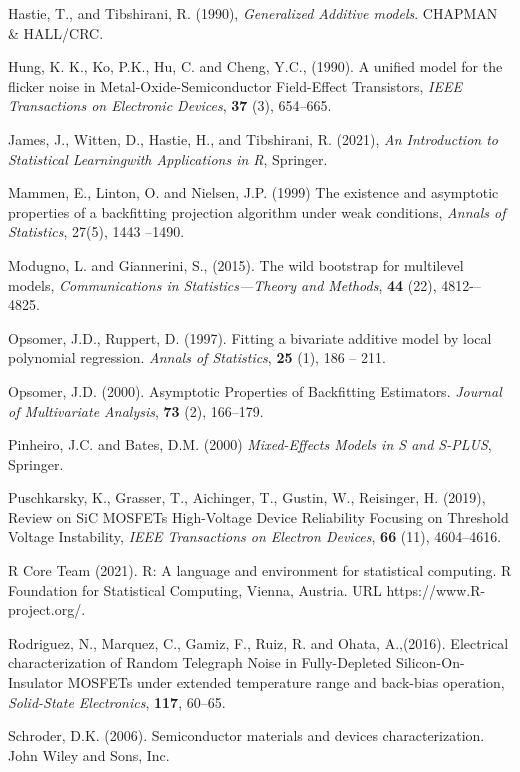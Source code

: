 \documentclass[sn-mathphys]{sn-jnl}%
\theoremstyle{thmstyleone}%
\theoremstyle{thmstyletwo}%
\theoremstyle{thmstylethree}%
\begin{document}
\begin{thebibliography}{00}
	 Hastie, T., and Tibshirani, R. (1990), {\it Generalized Additive models}. CHAPMAN \& HALL/CRC.
	
	 Hung, K. K., Ko, P.K., Hu, C. and Cheng, Y.C., (1990). A unified model for the flicker noise in Metal-Oxide-Semiconductor Field-Effect Transistors, {\it IEEE Transactions on Electronic Devices}, {\bf 37} (3), 654--665.
	
	 James, J., Witten, D., Hastie, H., and Tibshirani, R. (2021), {\it An Introduction to Statistical Learningwith Applications in R}, Springer.

	 Mammen, E., Linton, O. and Nielsen, J.P. (1999) The existence and asymptotic properties of a backfitting projection algorithm under weak conditions, {\it Annals of Statistics}, 27(5), 1443 --1490.
	
	 Modugno, L. and Giannerini, S., (2015). The wild bootstrap for multilevel models, {\it Communications in Statistics—Theory and Methods}, {\bf 44} (22), 4812-–4825.
	
	 Opsomer, J.D., Ruppert, D. (1997). Fitting a bivariate additive model by local polynomial regression. {\it Annals of Statistics}, {\bf 25} (1), 186 -- 211.
	
	 Opsomer, J.D. (2000). Asymptotic Properties of Backfitting Estimators. {\it Journal of Multivariate Analysis}, {\bf 73} (2),  166--179.
	
	 Pinheiro, J.C. and Bates, D.M. (2000) {\it Mixed-Effects Models in S and S-PLUS}, Springer.
	
	 Puschkarsky, K., Grasser, T., Aichinger, T., Gustin, W., Reisinger, H. (2019), Review on SiC MOSFETs High-Voltage Device Reliability Focusing on Threshold Voltage Instability, {\it IEEE Transactions on Electron Devices}, {\bf 66} (11), 4604--4616.
	
	R Core Team (2021). R: A language and environment for statistical computing. R Foundation for Statistical Computing, Vienna, Austria. URL
	https://www.R-project.org/.
	
	
	 Rodriguez, N., Marquez, C., Gamiz, F., Ruiz, R. and Ohata, A.,(2016).  Electrical characterization of Random Telegraph Noise in Fully-Depleted Silicon-On-Insulator MOSFETs under extended temperature range and back-bias operation, {\it Solid-State Electronics}, {\bf 117}, 60--65.
	
	 Schroder, D.K. (2006). Semiconductor materials and devices characterization. John Wiley and Sons, Inc.
	

\end{thebibliography}
\end{document}
